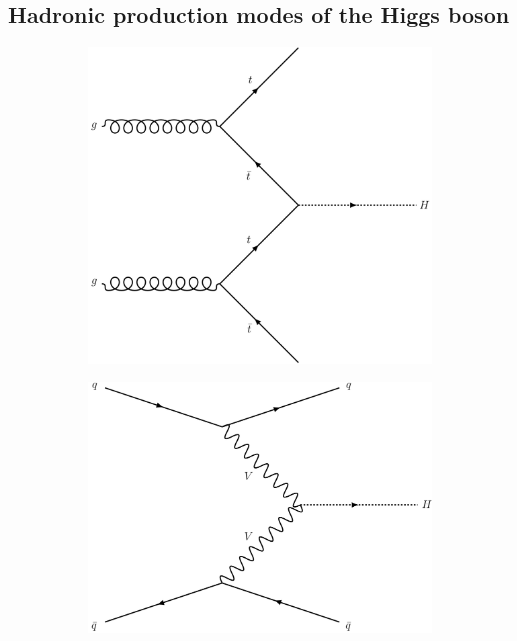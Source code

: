 \subsection{Hadronic production modes of the Higgs boson}
\label{subsec:htoinv_production_modes}

\begin{figure}[htbp]
    \centering
    \begin{subfigure}[b]{0.5\textwidth}
        \includegraphics[width=\textwidth]{feynman_diagrams/ttH.png}
        \caption{\ttH}
    \end{subfigure}
    \hfill
    \begin{subfigure}[b]{0.45\textwidth}
        \includegraphics[width=\textwidth]{feynman_diagrams/VBF.png}

\end{subfigure}
\end{figure}
